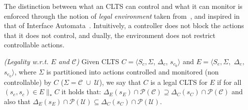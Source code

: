The distinction between what an CLTS can control and what it can monitor is enforced through the notion of 
{\em legal environment} taken from~\cite{DIppolito:2013}, and inspired in that of Interface Automata~\cite{DBLP:conf/sigsoft/AlfaroH01}.
Intuitively, a controller does not block the actions that it does not control, and dually, the environment does not restrict controllable actions. 

\begin{definition}
	\label{def:legal_clts} \emph{(Legality w.r.t. $E$ and $\mathcal{C}$)} 
	Given CLTS $C = \langle S_c, \Sigma$, $\Delta_c$, $s_{c_0}\rangle$ and $E = \langle S_e,\Sigma,$ $\Delta_e,$ $s_{e_0}\rangle$, where $\Sigma$ is partitioned into actions controlled and monitored (non controllable) by $C$ ($\Sigma=\mathcal{C} \; \cup \;\mathcal{U}$), we say that $C$ is a legal CLTS for $E$ if for all $(s_e,s_c) \in E \parallel_* C$ it holds that:
	$\Delta_{E}(s_E)\cap \mathcal{P}(\mathcal{C}) \supseteq \Delta_{C}(s_C)\cap \mathcal{P}(\mathcal{C})$ and also that  $\Delta_{E}(s_E)\cap \mathcal{P}(\mathcal{U}) \subseteq \Delta_{C}(s_C)\cap \mathcal{P}(\mathcal{U})$.
\end{definition}







